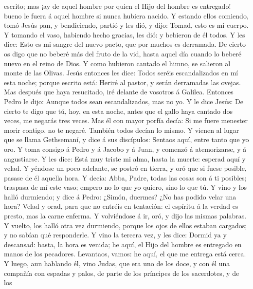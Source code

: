 escrito; mas ¡ay de aquel hombre por quien el Hijo del hombre es
entregado! bueno le fuera á aquel hombre si nunca hubiera nacido.
 Y estando ellos comiendo, tomó Jesús pan, y bendiciendo,
partió y les dió, y dijo: Tomad, esto es mi cuerpo.  Y
tomando el vaso, habiendo hecho gracias, les dió: y bebieron de él
todos.  Y les dice: Esto es mi sangre del nuevo pacto, que
por muchos es derramada.  De cierto os digo que no beberé
más del fruto de la vid, hasta aquel día cuando lo beberé nuevo en el
reino de Dios.  Y como hubieron cantado el himno, se
salieron al monte de las Olivas.  Jesús entonces les dice:
Todos seréis escandalizados en mí esta noche; porque escrito está:
Heriré al pastor, y serán derramadas las ovejas.  Mas
después que haya resucitado, iré delante de vosotros á Galilea.
 Entonces Pedro le dijo: Aunque todos sean escandalizados,
mas no yo.  Y le dice Jesús: De cierto te digo que tú, hoy,
en esta noche, antes que el gallo haya cantado dos veces, me negarás
tres veces.  Mas él con mayor porfía decía: Si me fuere
menester morir contigo, no te negaré. También todos decían lo mismo.
 Y vienen al lugar que se llama Gethsemaní, y dice á sus
discípulos: Sentaos aquí, entre tanto que yo oro.  Y toma
consigo á Pedro y á Jacobo y á Juan, y comenzó á atemorizarse, y á
angustiarse.  Y les dice: Está muy triste mi alma, hasta la
muerte: esperad aquí y velad.  Y yéndose un poco adelante,
se postró en tierra, y oró que si fuese posible, pasase de él aquella
hora.  Y decía: Abba, Padre, todas las cosas son á ti
posibles; traspasa de mí este vaso; empero no lo que yo quiero, sino lo
que tú.  Y vino y los halló durmiendo; y dice á Pedro:
¿Simón, duermes? ¿No has podido velar una hora?  Velad y
orad, para que no entréis en tentación: el espíritu á la verdad es
presto, mas la carne enferma.  Y volviéndose á ir, oró, y
dijo las mismas palabras.  Y vuelto, los halló otra vez
durmiendo, porque los ojos de ellos estaban cargados; y no sabían qué
responderle.  Y vino la tercera vez, y les dice: Dormid ya
y descansad: basta, la hora es venida; he aquí, el Hijo del hombre es
entregado en manos de los pecadores.  Levantaos, vamos: he
aquí, el que me entrega está cerca.  Y luego, aun hablando
él, vino Judas, que era uno de los doce, y con él una compañía con
espadas y palos, de parte de los príncipes de los sacerdotes, y de los
